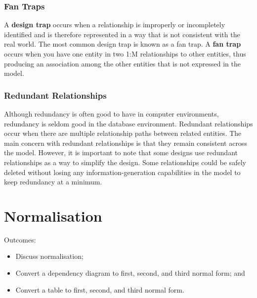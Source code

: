\documentclass[a4paper, 12pt, titlepage]{report}
\begin{document}
{\subsection{Fan Traps}
A \textbf{design trap} occurs when a relationship is improperly or incompletely identified and is therefore represented in a way that is not consistent with the real world. The most common design trap is known as a fan trap. A \textbf{fan trap} occurs when you have one entity in two 1:M relationships to other entities, thus producing an association among the other entities that is not expressed in the model. 
\subsection{Redundant Relationships}
Although redundancy is often good to have in computer environments, redundancy is seldom good in the database environment. Redundant relationships occur when there are multiple relationship paths between related entities. The main concern with redundant relationships is that they remain consistent across the model. However, it is important to note that some designs use redundant relationships as a way to simplify the design. Some relationships could be safely deleted without losing any information-generation capabilities in the model to keep redundancy at a minimum.
\chapter{Normalisation}
Outcomes:
\begin{itemize}
\item Discuss normalisation;
\item Convert a dependency diagram to first, second, and third normal form; and
\item Convert a table to first, second, and third normal form.
\end{itemize}
}
\end{document}
